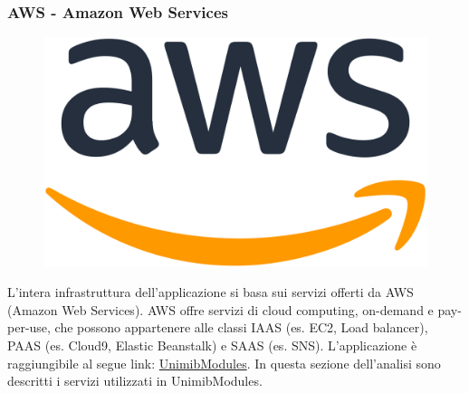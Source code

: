 \documentclass[12pt]{article}
\begin{document}
\subsubsection{AWS - Amazon Web Services}
\begin{figure}[H]
\includegraphics[scale=0.08, left]{aws-logo.png}
\end{figure}
L'intera infrastruttura dell'applicazione si basa sui servizi offerti da AWS (Amazon Web Services). AWS offre servizi di cloud computing, on-demand e pay-per-use, che possono appartenere alle classi IAAS (es. EC2, Load balancer), PAAS (es. Cloud9, Elastic Beanstalk) e SAAS (es. SNS). L'applicazione è raggiungibile al segue link: \textcolor{blue}{\href{http://unimibquestionari-env.eba-3behr9mi.eu-central-1.elasticbeanstalk.com/}{UnimibModules}}. In questa sezione dell'analisi sono descritti i servizi utilizzati in UnimibModules. 
\end{document}
